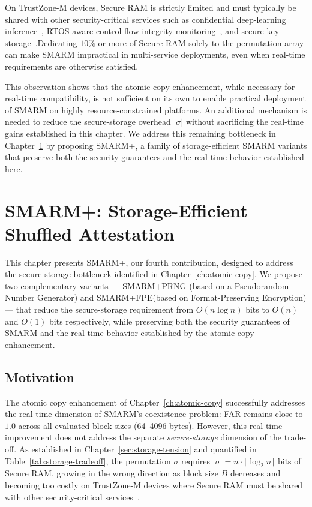 \documentclass[a4paper,10pt]{article}
\begin{document}
{On TrustZone-M devices, Secure RAM is strictly limited and must 
typically be shared with other security-critical services such as 
confidential deep-learning inference~\cite{islam2023confidential}, 
RTOS-aware control-flow integrity 
monitoring~\cite{kawada2021tzmcfi}, and secure key 
storage~\cite{silabs2020an1271}.Dedicating $10\%$ or more of 
Secure RAM solely to the permutation array can make SMARM 
impractical in multi-service deployments, even when real-time 
requirements are otherwise satisfied.

This observation shows that the atomic copy enhancement, while 
necessary for real-time compatibility, is not sufficient on its 
own to enable practical deployment of SMARM on highly 
resource-constrained platforms. An additional mechanism is 
needed to reduce the secure-storage overhead $|\sigma|$ without 
sacrificing the real-time gains established in this chapter. We 
address this remaining bottleneck in 
Chapter~\ref{ch:smarmplus} by proposing SMARM+, a family of 
storage-efficient SMARM variants that preserve both the security 
guarantees and the real-time behavior established here.


\section{SMARM+: Storage-Efficient Shuffled Attestation}
\label{ch:smarmplus}

This chapter presents SMARM+, our fourth contribution, designed to 
address the secure-storage bottleneck identified in 
Chapter~\ref{ch:atomic-copy}. We propose two complementary variants 
— SMARM+PRNG (based on a Pseudorandom Number 
Generator) and SMARM+FPE(based on Format-Preserving 
Encryption) — that reduce the secure-storage requirement from 
$O(n \log n)$ bits to $O(n)$ and $O(1)$ bits respectively, while 
preserving both the security guarantees of SMARM and the real-time 
behavior established by the atomic copy enhancement.

\subsection{Motivation}
\label{sec:smarmplus-motivation}

The atomic copy enhancement of Chapter~\ref{ch:atomic-copy} 
successfully addresses the real-time dimension of SMARM's coexistence 
problem: FAR remains close to $1.0$ across all evaluated block sizes 
(64--4096 bytes). However, this real-time improvement does not 
address the separate \emph{secure-storage} dimension of the 
trade-off. As established in Chapter~\ref{sec:storage-tension} and
quantified in Table~\ref{tab:storage-tradeoff}, the permutation 
$\sigma$ requires $|\sigma| = n \cdot \lceil \log_2 n \rceil$ bits 
of Secure RAM, growing in the wrong direction as block size $B$ 
decreases and becoming too costly on TrustZone-M devices where 
Secure RAM must be shared with other security-critical 
services~\cite{islam2023confidential, kawada2021tzmcfi, silabs2020an1271}.

}
\end{document}
